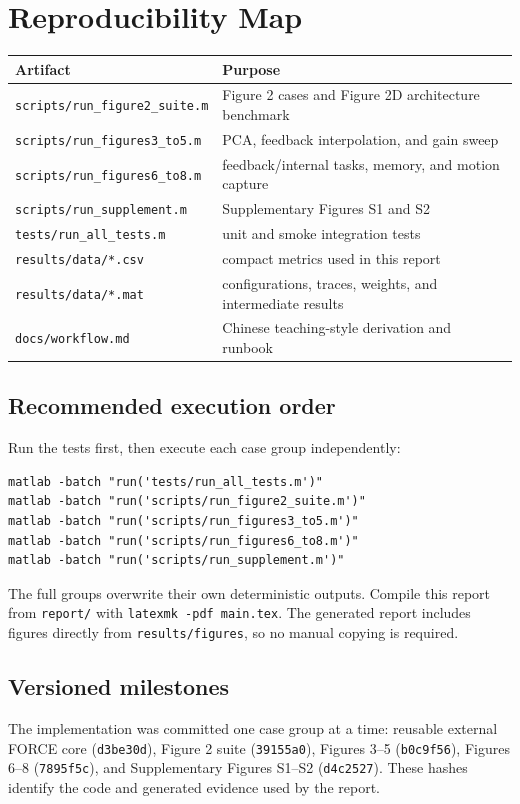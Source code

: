 \section{Reproducibility Map}

\begin{tabularx}{\linewidth}{@{}l X@{}}
\toprule
Artifact & Purpose \\
\midrule
\texttt{scripts/run\_figure2\_suite.m} & Figure 2 cases and Figure 2D architecture benchmark \\
\texttt{scripts/run\_figures3\_to5.m} & PCA, feedback interpolation, and gain sweep \\
\texttt{scripts/run\_figures6\_to8.m} & feedback/internal tasks, memory, and motion capture \\
\texttt{scripts/run\_supplement.m} & Supplementary Figures S1 and S2 \\
\texttt{tests/run\_all\_tests.m} & unit and smoke integration tests \\
\texttt{results/data/*.csv} & compact metrics used in this report \\
\texttt{results/data/*.mat} & configurations, traces, weights, and intermediate results \\
\texttt{docs/workflow.md} & Chinese teaching-style derivation and runbook \\
\bottomrule
\end{tabularx}

\subsection{Recommended execution order}
Run the tests first, then execute each case group independently:
\begin{verbatim}
matlab -batch "run('tests/run_all_tests.m')"
matlab -batch "run('scripts/run_figure2_suite.m')"
matlab -batch "run('scripts/run_figures3_to5.m')"
matlab -batch "run('scripts/run_figures6_to8.m')"
matlab -batch "run('scripts/run_supplement.m')"
\end{verbatim}
The full groups overwrite their own deterministic outputs. Compile this report from \texttt{report/} with \texttt{latexmk -pdf main.tex}. The generated report includes figures directly from \texttt{results/figures}, so no manual copying is required.

\subsection{Versioned milestones}
The implementation was committed one case group at a time: reusable external FORCE core (\texttt{d3be30d}), Figure 2 suite (\texttt{39155a0}), Figures 3--5 (\texttt{b0c9f56}), Figures 6--8 (\texttt{7895f5c}), and Supplementary Figures S1--S2 (\texttt{d4c2527}). These hashes identify the code and generated evidence used by the report.
